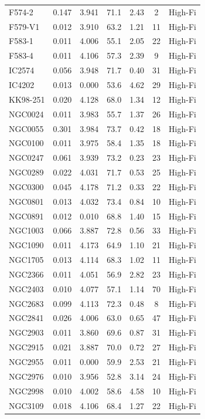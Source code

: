 \begin{longtable}{lcccccc}
F574-2 & 0.147 & 3.941 & 71.1 & 2.43 & 2 & High-Fi \\
F579-V1 & 0.012 & 3.910 & 63.2 & 1.21 & 11 & High-Fi \\
F583-1 & 0.011 & 4.006 & 55.1 & 2.05 & 22 & High-Fi \\
F583-4 & 0.011 & 4.106 & 57.3 & 2.39 & 9 & High-Fi \\
IC2574 & 0.056 & 3.948 & 71.7 & 0.40 & 31 & High-Fi \\
IC4202 & 0.013 & 0.000 & 53.6 & 4.62 & 29 & High-Fi \\
KK98-251 & 0.020 & 4.128 & 68.0 & 1.34 & 12 & High-Fi \\
NGC0024 & 0.011 & 3.983 & 55.7 & 1.37 & 26 & High-Fi \\
NGC0055 & 0.301 & 3.984 & 73.7 & 0.42 & 18 & High-Fi \\
NGC0100 & 0.011 & 3.975 & 58.4 & 1.35 & 18 & High-Fi \\
NGC0247 & 0.061 & 3.939 & 73.2 & 0.23 & 23 & High-Fi \\
NGC0289 & 0.022 & 4.031 & 71.7 & 0.53 & 25 & High-Fi \\
NGC0300 & 0.045 & 4.178 & 71.2 & 0.33 & 22 & High-Fi \\
NGC0801 & 0.013 & 4.032 & 73.4 & 0.84 & 10 & High-Fi \\
NGC0891 & 0.012 & 0.010 & 68.8 & 1.40 & 15 & High-Fi \\
NGC1003 & 0.066 & 3.887 & 72.8 & 0.56 & 33 & High-Fi \\
NGC1090 & 0.011 & 4.173 & 64.9 & 1.10 & 21 & High-Fi \\
NGC1705 & 0.013 & 4.114 & 68.3 & 1.02 & 11 & High-Fi \\
NGC2366 & 0.011 & 4.051 & 56.9 & 2.82 & 23 & High-Fi \\
NGC2403 & 0.010 & 4.077 & 57.1 & 1.14 & 70 & High-Fi \\
NGC2683 & 0.099 & 4.113 & 72.3 & 0.48 & 8 & High-Fi \\
NGC2841 & 0.026 & 4.006 & 63.0 & 0.65 & 47 & High-Fi \\
NGC2903 & 0.011 & 3.860 & 69.6 & 0.87 & 31 & High-Fi \\
NGC2915 & 0.021 & 3.887 & 70.0 & 0.72 & 27 & High-Fi \\
NGC2955 & 0.011 & 0.000 & 59.9 & 2.53 & 21 & High-Fi \\
NGC2976 & 0.010 & 3.956 & 52.8 & 3.14 & 24 & High-Fi \\
NGC2998 & 0.010 & 4.002 & 58.6 & 4.58 & 10 & High-Fi \\
NGC3109 & 0.018 & 4.106 & 68.4 & 1.27 & 22 & High-Fi \\

\end{longtable}
